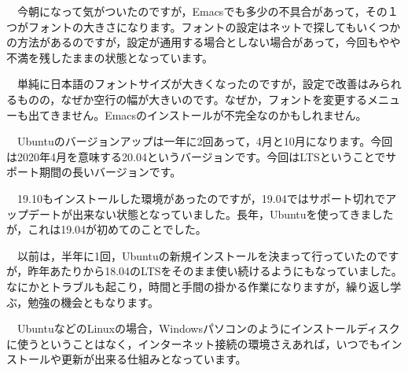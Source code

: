 \documentclass[]{ltjarticle}
\begin{document}
　今朝になって気がついたのですが，Emacsでも多少の不具合があって，その１つがフォントの大きさになります。フォントの設定はネットで探してもいくつかの方法があるのですが，設定が通用する場合としない場合があって，今回もやや不満を残したままの状態となっています。

　単純に日本語のフォントサイズが大きくなったのですが，設定で改善はみられるものの，なぜか空行の幅が大きいのです。なぜか，フォントを変更するメニューも出てきません。Emacsのインストールが不完全なのかもしれません。

　Ubuntuのバージョンアップは一年に2回あって，4月と10月になります。今回は2020年4月を意味する20.04というバージョンです。今回はLTSということでサポート期間の長いバージョンです。

　19.10もインストールした環境があったのですが，19.04ではサポート切れでアップデートが出来ない状態となっていました。長年，Ubuntuを使ってきましたが，これは19.04が初めてのことでした。

　以前は，半年に1回，Ubuntuの新規インストールを決まって行っていたのですが，昨年あたりから18.04のLTSをそのまま使い続けるようにもなっていました。なにかとトラブルも起こり，時間と手間の掛かる作業になりますが，繰り返し学ぶ，勉強の機会ともなります。

　UbuntuなどのLinuxの場合，Windowsパソコンのようにインストールディスクに使うということはなく，インターネット接続の環境さえあれば，いつでもインストールや更新が出来る仕組みとなっています。
\end{document}
